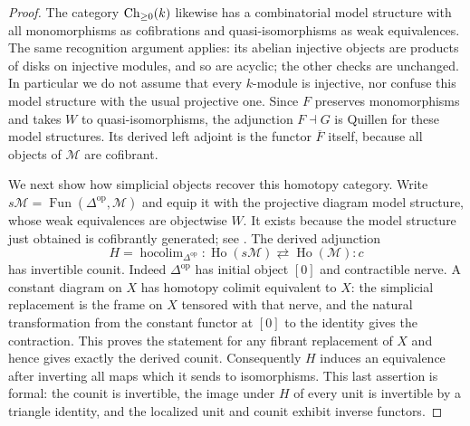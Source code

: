 \begin{proof}
The category $\operatorname{Ch}_{\geq0}(k)$ likewise has a combinatorial model structure with all monomorphisms as cofibrations and quasi-isomorphisms as weak equivalences. The same recognition argument applies: its abelian injective objects are products of disks on injective modules, and so are acyclic; the other checks are unchanged. In particular we do not assume that every $k$-module is injective, nor confuse this model structure with the usual projective one. Since $F$ preserves monomorphisms and takes $W$ to quasi-isomorphisms, the adjunction $F\dashv G$ is Quillen for these model structures. Its derived left adjoint is the functor $\overline F$ itself, because all objects of $\mathcal M$ are cofibrant.

We next show how simplicial objects recover this homotopy category. Write $s\mathcal M=\operatorname{Fun}(\Delta^{\mathrm{op}},\mathcal M)$ and equip it with the projective diagram model structure, whose weak equivalences are objectwise $W$. It exists because the model structure just obtained is cofibrantly generated; see \citet[Theorem 19.4]{DuggerHocolim}. The derived adjunction
\[
 H=\operatorname{hocolim}_{\Delta^{\mathrm{op}}}:
 \operatorname{Ho}(s\mathcal M)\rightleftarrows
 \operatorname{Ho}(\mathcal M):c
\]
has invertible counit. Indeed $\Delta^{\mathrm{op}}$ has initial object $[0]$ and contractible nerve. A constant diagram on $X$ has homotopy colimit equivalent to $X$: the simplicial replacement is the frame on $X$ tensored with that nerve, and the natural transformation from the constant functor at $[0]$ to the identity gives the contraction. This proves the statement for any fibrant replacement of $X$ and hence gives exactly the derived counit. Consequently $H$ induces an equivalence after inverting all maps which it sends to isomorphisms. This last assertion is formal: the counit is invertible, the image under $H$ of every unit is invertible by a triangle identity, and the localized unit and counit exhibit inverse functors.


\end{proof}
